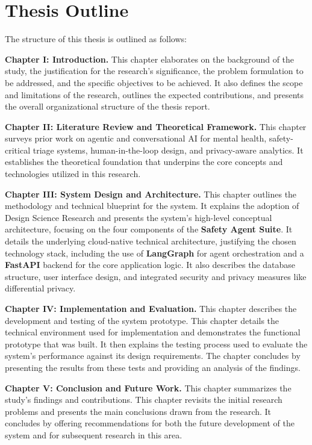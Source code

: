 \section{Thesis Outline}
\label{sec:thesis_outline}

The structure of this thesis is outlined as follows:

\textbf{Chapter I: Introduction.} This chapter elaborates on the background of the study, the justification for the research's significance, the problem formulation to be addressed, and the specific objectives to be achieved. It also defines the scope and limitations of the research, outlines the expected contributions, and presents the overall organizational structure of the thesis report.

\textbf{Chapter II: Literature Review and Theoretical Framework.} This chapter surveys prior work on agentic and conversational AI for mental health, safety-critical triage systems, human-in-the-loop design, and privacy-aware analytics. It establishes the theoretical foundation that underpins the core concepts and technologies utilized in this research.

\textbf{Chapter III: System Design and Architecture.} This chapter outlines the methodology and technical blueprint for the system. It explains the adoption of Design Science Research and presents the system's high-level conceptual architecture, focusing on the four components of the \textbf{Safety Agent Suite}. It details the underlying cloud-native technical architecture, justifying the chosen technology stack, including the use of \textbf{LangGraph} for agent orchestration and a \textbf{FastAPI} backend for the core application logic. It also describes the database structure, user interface design, and integrated security and privacy measures like differential privacy.

\textbf{Chapter IV: Implementation and Evaluation.} This chapter describes the development and testing of the system prototype. This chapter details the technical environment used for implementation and demonstrates the functional prototype that was built. It then explains the testing process used to evaluate the system's performance against its design requirements. The chapter concludes by presenting the results from these tests and providing an analysis of the findings.

\textbf{Chapter V: Conclusion and Future Work.} This chapter summarizes the study's findings and contributions. This chapter revisits the initial research problems and presents the main conclusions drawn from the research. It concludes by offering recommendations for both the future development of the system and for subsequent research in this area.

